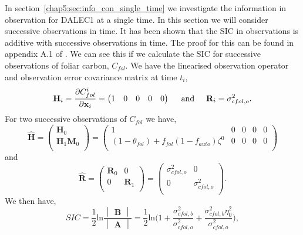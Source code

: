 In section~\ref{chap5:sec:info_con_single_time} we investigate the information in observation for DALEC1 at a single time. In this section we will consider successive observations in time. It has been shown that the SIC in observations is additive with successive observations in time. The proof for this can be found in appendix A.1 of \citet{Fowler2012}. We can see this if we calculate the SIC for successive observations of foliar carbon, \(C_{fol}\). We have the linearised observation operator and observation error covariance matrix at time $t_i$,
\begin{equation}
\mathbf{H}_{i} = \frac{\partial C_{fol}^{i}}{\partial \textbf{x}_i} = \begin{pmatrix}
1 & 0 & 0 & 0 & 0
\end{pmatrix}
\hspace{5mm} \text{and} \hspace{5mm}
\mathbf{R}_i=\sigma_{cfol,o}^{2}.
\end{equation}
For two successive observations of \(C_{fol}\) we have,
\begin{equation}
\hat{\mathbf{H}}=
\begin{pmatrix}
\mathbf{H}_0 \\
\mathbf{H}_1\mathbf{M}_0\\
\end{pmatrix}
=
\begin{pmatrix}
1 & 0 & 0 & 0 & 0 \\
(1-\theta_{fol})+f_{fol}(1-f_{auto})\zeta^0 & 0 & 0 & 0 & 0\\
\end{pmatrix}
\end{equation}
and
\begin{equation}
\hat{\mathbf{R}}=
\begin{pmatrix}
\mathbf{R}_0 & 0  \\
0 & \mathbf{R}_1  \\
\end{pmatrix}
=
\begin{pmatrix}
\sigma_{cfol,o}^{2} & 0  \\
0 & \sigma_{cfol,o}^{2}  \\
\end{pmatrix}.
\end{equation}
We then have,
\begin{equation}
SIC = \frac{1}{2}\text{ln}\frac{\begin{vmatrix} \mathbf{B} \end{vmatrix}}{\begin{vmatrix} \mathbf{A} \end{vmatrix}} =\frac{1}{2}\text{ln} \bigg(1+\frac{\sigma_{cfol,b}^{2}}{\sigma_{cfol,o}^{2}}+\frac{\sigma_{cfol,b}^{2}\eta_0^{2}}{\sigma_{cfol,o}^{2}} \bigg), \label{chap5:eq:sic_2cfol}
\end{equation}
